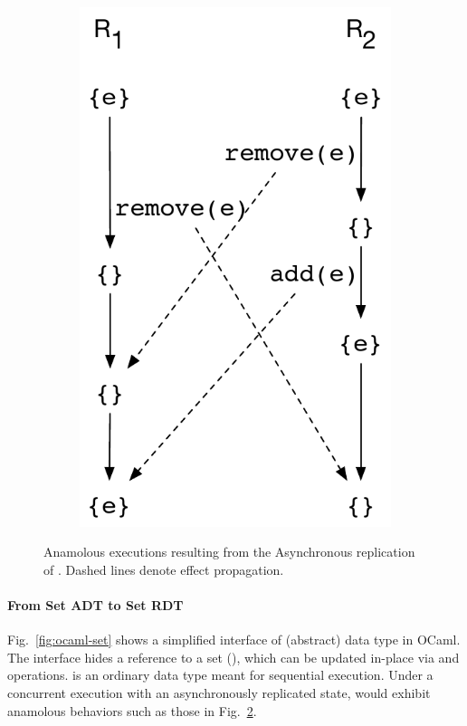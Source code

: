 \begin{figure}[ht]
\begin{subfigure}[t]{0.44\columnwidth}
    \includegraphics[scale=0.35]{Figures/crdt-execs-2}
    \caption{}
    \label{fig:crdt-exec-2}
  \end{subfigure}
\caption{Anamolous executions resulting from the Asynchronous
  replication of . Dashed lines denote effect propagation.}
\label{fig:crdt-execs}
\end{figure}

\noindent\paragraph{From Set ADT to Set RDT} Fig.~\ref{fig:ocaml-set}
shows a simplified interface of  (abstract) data type in OCaml.
The interface hides a reference to a set (), which can be
updated in-place via  and  operations.  is an
ordinary data type meant for sequential execution. Under a
concurrent execution with an asynchronously replicated state, 
would exhibit anamolous behaviors such as those in
Fig.~\ref{fig:crdt-execs}.

